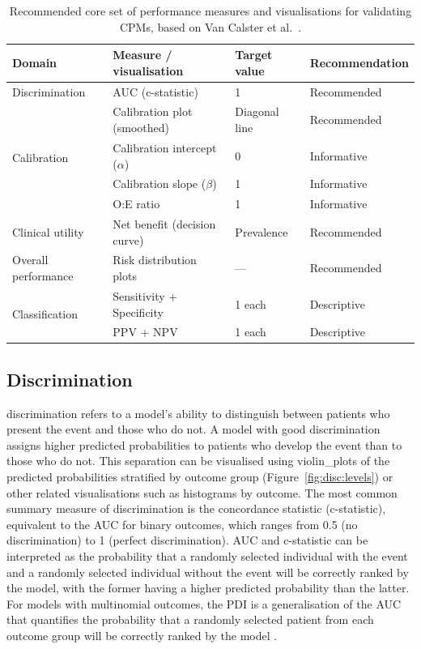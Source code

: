 \begin{table}[htbp]
\centering
\begin{threeparttable}
\caption[Recommended performance measures for validating prediction models]{Recommended core set of performance measures and visualisations for validating \glspl{CPM}, based on Van Calster et al.\ \cite{vancalsterPerformanceEvaluationPredictive2024}.}
\label{tab:intro:metrics}
\footnotesize
\begin{tabularx}{\textwidth}{l >{\raggedright\arraybackslash}X ll}
\toprule
\textbf{Domain} & \textbf{Measure / visualisation} & \textbf{Target value} & \textbf{Recommendation} \\
\midrule
Discrimination
  & AUC (c-statistic) & 1 & Recommended \\
\midrule
\multirow{4}{*}{Calibration}
  & Calibration plot (smoothed) & Diagonal line & Recommended \\
  & Calibration intercept ($\alpha$) & 0 & Informative \\
  & Calibration slope ($\beta$) & 1 & Informative \\
  & O:E ratio & 1 & Informative \\
\midrule
Clinical utility
  & Net benefit (decision curve) & Prevalence & Recommended \\
  \midrule
Overall performance
  & Risk distribution plots & --- & Recommended \\
\midrule
\midrule
\multirow{2}{*}{Classification}
  & Sensitivity + Specificity & 1 each & Descriptive \\
  & PPV + NPV & 1 each & Descriptive \\
\bottomrule
\end{tabularx}
\end{threeparttable}
\end{table}

\subsection{Discrimination}

\Gls{discrimination} refers to a model's ability to distinguish between patients who present the event and those who do not. A model with good discrimination assigns higher predicted probabilities to patients who develop the event than to those who do not. This separation can be visualised using \glspl{violin_plot} of the predicted probabilities stratified by outcome group (Figure~\ref{fig:disc:levels}) or other related visualisations such as histograms by outcome. The most common summary measure of \gls{discrimination} is the concordance statistic (c-statistic), equivalent to the \gls{AUC} for binary outcomes, which ranges from 0.5 (no discrimination) to 1 (perfect discrimination). \gls{AUC} and c-statistic can be interpreted as the probability that a randomly selected individual with the event and a randomly selected individual without the event will be correctly ranked by the model, with the former having a higher predicted probability than the latter. For models with multinomial outcomes, the \gls{PDI} is a generalisation of the \gls{AUC} that quantifies the probability that a randomly selected patient from each outcome group will be correctly ranked by the model \cite{van2012extending}.

